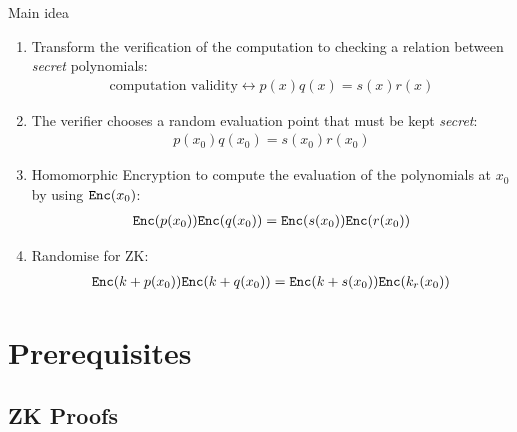 \documentclass[handout]{beamer}
\begin{document}
\begin{frame}{Main idea} 
\begin{tiny}
\begin{enumerate}
\item Transform the verification of the computation to checking a relation between \emph{secret} polynomials: 
\begin{align*}\textrm{computation validity} \leftrightarrow p(x)q(x)=s(x)r(x) \end{align*} \pause
\item The verifier chooses a random evaluation point that must be kept \emph{secret}: 
\begin{align*} p(x_0)q(x_0)=s(x_0)r(x_0) \end{align*} \pause
\item Homomorphic Encryption to compute the evaluation of the polynomials at $x_0$ by using $\mathtt{Enc}(x_0)$:
\begin{align*}\mathtt{Enc}(p(x_0))\mathtt{Enc}(q(x_0))=\mathtt{Enc}(s(x_0))\mathtt{Enc}(r(x_0))
\end{align*} \pause
\item Randomise for ZK:
\begin{align*}
\mathtt{Enc}(k+p(x_0))\mathtt{Enc}(k+q(x_0))   =\mathtt{Enc}(k+s(x_0))\mathtt{Enc}(k_ r(x_0))   
\end{align*}
\end{enumerate}
\end{tiny}
\end{frame}

\section{Prerequisites}

\subsection{ZK Proofs}
\end{document}
